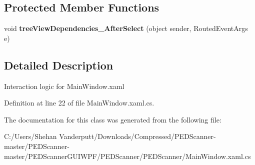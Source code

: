 \subsection*{Protected Member Functions}
\begin{DoxyCompactItemize}
\item 
\mbox{\label{class_wizard_1_1_main_window_a8f24447d5aca177216cbff16a84aa14d}} 
void {\bfseries tree\+View\+Dependencies\+\_\+\+After\+Select} (object sender, Routed\+Event\+Args e)
\end{DoxyCompactItemize}


\subsection{Detailed Description}
Interaction logic for Main\+Window.\+xaml 



Definition at line 22 of file Main\+Window.\+xaml.\+cs.



The documentation for this class was generated from the following file\+:\begin{DoxyCompactItemize}
\item 
C\+:/\+Users/\+Shehan Vanderputt/\+Downloads/\+Compressed/\+P\+E\+D\+Scanner-\/master/\+P\+E\+D\+Scanner-\/master/\+P\+E\+D\+Scanner\+G\+U\+I\+W\+P\+F/\+P\+E\+D\+Scanner/\+P\+E\+D\+Scanner/Main\+Window.\+xaml.\+cs\end{DoxyCompactItemize}
